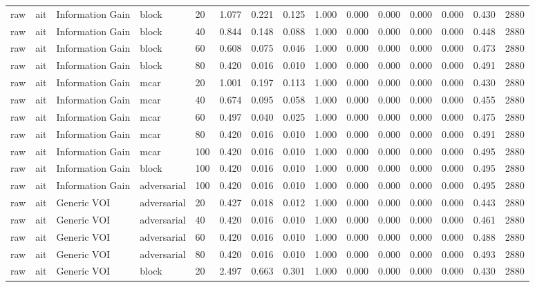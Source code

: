 \begin{table}[!ht]
{\begin{tabular}{lllllllllllllll}
raw & ait & Information Gain & block & 20 & 1.077 & 0.221 & 0.125 & 1.000 & 0.000 & 0.000 & 0.000 & 0.000 & 0.430 & 2880 \\
raw & ait & Information Gain & block & 40 & 0.844 & 0.148 & 0.088 & 1.000 & 0.000 & 0.000 & 0.000 & 0.000 & 0.448 & 2880 \\
raw & ait & Information Gain & block & 60 & 0.608 & 0.075 & 0.046 & 1.000 & 0.000 & 0.000 & 0.000 & 0.000 & 0.473 & 2880 \\
raw & ait & Information Gain & block & 80 & 0.420 & 0.016 & 0.010 & 1.000 & 0.000 & 0.000 & 0.000 & 0.000 & 0.491 & 2880 \\
raw & ait & Information Gain & mcar & 20 & 1.001 & 0.197 & 0.113 & 1.000 & 0.000 & 0.000 & 0.000 & 0.000 & 0.430 & 2880 \\
raw & ait & Information Gain & mcar & 40 & 0.674 & 0.095 & 0.058 & 1.000 & 0.000 & 0.000 & 0.000 & 0.000 & 0.455 & 2880 \\
raw & ait & Information Gain & mcar & 60 & 0.497 & 0.040 & 0.025 & 1.000 & 0.000 & 0.000 & 0.000 & 0.000 & 0.475 & 2880 \\
raw & ait & Information Gain & mcar & 80 & 0.420 & 0.016 & 0.010 & 1.000 & 0.000 & 0.000 & 0.000 & 0.000 & 0.491 & 2880 \\
raw & ait & Information Gain & mcar & 100 & 0.420 & 0.016 & 0.010 & 1.000 & 0.000 & 0.000 & 0.000 & 0.000 & 0.495 & 2880 \\
raw & ait & Information Gain & block & 100 & 0.420 & 0.016 & 0.010 & 1.000 & 0.000 & 0.000 & 0.000 & 0.000 & 0.495 & 2880 \\
raw & ait & Information Gain & adversarial & 100 & 0.420 & 0.016 & 0.010 & 1.000 & 0.000 & 0.000 & 0.000 & 0.000 & 0.495 & 2880 \\
raw & ait & Generic VOI & adversarial & 20 & 0.427 & 0.018 & 0.012 & 1.000 & 0.000 & 0.000 & 0.000 & 0.000 & 0.443 & 2880 \\
raw & ait & Generic VOI & adversarial & 40 & 0.420 & 0.016 & 0.010 & 1.000 & 0.000 & 0.000 & 0.000 & 0.000 & 0.461 & 2880 \\
raw & ait & Generic VOI & adversarial & 60 & 0.420 & 0.016 & 0.010 & 1.000 & 0.000 & 0.000 & 0.000 & 0.000 & 0.488 & 2880 \\
raw & ait & Generic VOI & adversarial & 80 & 0.420 & 0.016 & 0.010 & 1.000 & 0.000 & 0.000 & 0.000 & 0.000 & 0.493 & 2880 \\
raw & ait & Generic VOI & block & 20 & 2.497 & 0.663 & 0.301 & 1.000 & 0.000 & 0.000 & 0.000 & 0.000 & 0.430 & 2880 \\

\end{tabular}}
\end{table}
